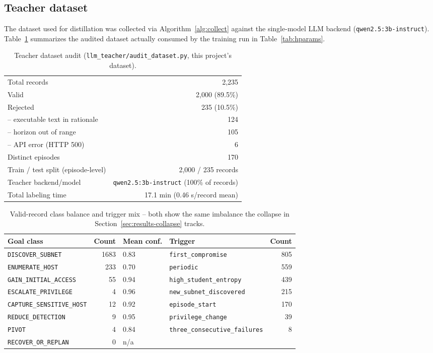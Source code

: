 \documentclass[11pt]{article}
\newcommand{\code}[1]{\texttt{#1}}
\begin{document}
\subsection{Teacher dataset}
The dataset used for distillation was collected via Algorithm~\ref{alg:collect}
against the single-model LLM backend (\code{qwen2.5:3b-instruct}). Table~\ref{tab:dataset-audit}
summarizes the audited dataset actually consumed by the training run in
Table~\ref{tab:hparams}.

\begin{table}[H]
\centering
\caption{Teacher dataset audit (\code{llm\_teacher/audit\_dataset.py}, this project's dataset).}
\label{tab:dataset-audit}
\begin{tabular}{lr}
\toprule
Total records & 2{,}235 \\
Valid & 2{,}000 (89.5\%) \\
Rejected & 235 (10.5\%) \\
\quad -- executable text in rationale & 124 \\
\quad -- horizon out of range & 105 \\
\quad -- API error (HTTP 500) & 6 \\
Distinct episodes & 170 \\
Train / test split (episode-level) & 2{,}000 / 235 records \\
Teacher backend/model & \code{qwen2.5:3b-instruct} (100\% of records) \\
Total labeling time & 17.1 min (0.46 s/record mean) \\
\bottomrule
\end{tabular}
\end{table}

\begin{table}[H]
\centering
\caption{Valid-record class balance and trigger mix -- both show the same
imbalance the collapse in Section~\ref{sec:results-collapse} tracks.}
\label{tab:class-balance}
\small
\begin{tabular}{lrl||lr}
\toprule
Goal class & Count & Mean conf. & Trigger & Count \\
\midrule
\code{DISCOVER\_SUBNET} & 1683 & 0.83 & \code{first\_compromise} & 805 \\
\code{ENUMERATE\_HOST} & 233 & 0.70 & \code{periodic} & 559 \\
\code{GAIN\_INITIAL\_ACCESS} & 55 & 0.94 & \code{high\_student\_entropy} & 439 \\
\code{ESCALATE\_PRIVILEGE} & 4 & 0.96 & \code{new\_subnet\_discovered} & 215 \\
\code{CAPTURE\_SENSITIVE\_HOST} & 12 & 0.92 & \code{episode\_start} & 170 \\
\code{REDUCE\_DETECTION} & 9 & 0.95 & \code{privilege\_change} & 39 \\
\code{PIVOT} & 4 & 0.84 & \code{three\_consecutive\_failures} & 8 \\
\code{RECOVER\_OR\_REPLAN} & 0 & n/a & & \\
\bottomrule
\end{tabular}
\end{table}
\end{document}
